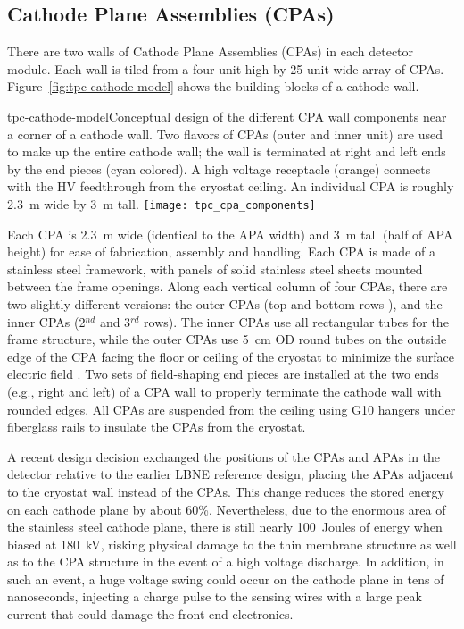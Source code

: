 \subsection{Cathode Plane Assemblies (CPAs)}
\label{subsec:fd-ref-cpa}


There are two walls of Cathode Plane Assemblies (CPAs) %
in each detector module.  Each wall is %
tiled from a four-unit-high by 25-unit-wide array of CPAs. Figure~\ref{fig:tpc-cathode-model} shows the
building blocks of a cathode wall. %
\begin{cdrfigure} %
{tpc-cathode-model}{Conceptual design of the different CPA wall %
components near a corner of a cathode wall.  Two flavors of CPAs (outer 
and inner unit) are used to make up the entire cathode wall; %
the wall is terminated at %
right and left ends by the end pieces (cyan colored).  A high voltage receptacle 
(orange) connects with the HV feedthrough from the cryostat ceiling. An individual 
CPA is roughly 2.3~m wide by 3~m tall.}
\texttt{[image: tpc\_cpa\_components]}
\end{cdrfigure}

Each CPA is 2.3~m wide (identical to the APA width) and 3~m tall (half
of APA height) for ease of fabrication, assembly and handling.  Each
CPA is made of a stainless steel framework, with panels of solid
stainless steel sheets mounted between the frame openings.  Along each
vertical column of %
four CPAs, there are two slightly different
versions: the outer CPAs (top and bottom rows ), and the inner CPAs
(2$^{nd}$ and 3$^{rd}$ rows).  The inner CPAs use all rectangular tubes for the
frame structure, while the outer CPAs use 5~cm OD round tubes on the
outside edge of the CPA facing the floor or ceiling of the cryostat to
minimize the surface electric field .  Two sets of field-shaping end
pieces are installed at the two ends (e.g., right and left) of a CPA wall to properly
terminate the cathode wall with rounded edges.  All CPAs are suspended
from the ceiling using G10 hangers under fiberglass rails to insulate
the CPAs from the cryostat.

A recent design decision exchanged the positions of the CPAs and APAs
in the detector relative to the earlier LBNE reference design, placing the APAs adjacent to the cryostat wall
instead of the CPAs. %
This change
reduces the stored energy on each cathode plane by about 60\%.
Nevertheless, due to the enormous area of the stainless steel cathode
plane, there is still nearly 100~Joules of energy when biased at
180~kV, risking physical damage to the thin membrane structure as well
as to the CPA structure in the event of a high voltage discharge.  In
addition, in such an event, a huge voltage swing could occur on the
cathode plane in tens of nanoseconds, injecting a charge pulse to the
sensing wires with a large peak current that could damage the
front-end electronics.

